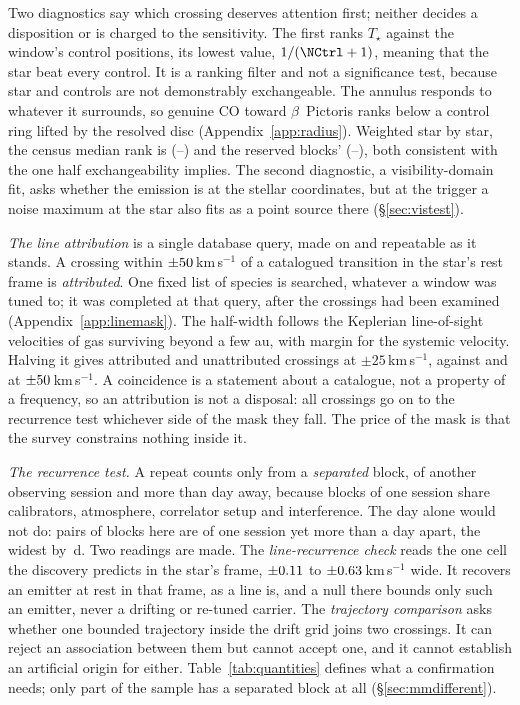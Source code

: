 Two diagnostics say which crossing deserves attention first; neither decides a
disposition or is charged to the sensitivity. The first ranks $T_\star$
against the window's \NCtrl{} control positions, its lowest value,
$1/(\NCtrl+1)$, meaning that the star beat every control. It is a ranking
filter and not a significance test, because star and controls are not
demonstrably exchangeable. The annulus responds to whatever it surrounds, so
genuine CO toward $\beta$~Pictoris ranks below a control ring lifted by the
resolved disc (Appendix~\ref{app:radius}). Weighted star by star, the census
median rank is \BkRankBalSurv{} (\BkRankBalSurvLo--\BkRankBalSurvHi) and the
reserved blocks' \BkRankBalHo{} (\BkRankBalHoLo--\BkRankBalHoHi), both
consistent with the one half exchangeability implies. The second diagnostic, a
visibility-domain fit, asks whether the emission is at the stellar
coordinates, but at the trigger a noise maximum at the star also fits as a
point source there (\S\ref{sec:vistest}).

\emph{The line attribution} is a single database query, made on \MkListDate{}
and repeatable as it stands. A crossing within $\pm50$\,km\,s$^{-1}$
of a catalogued transition in the star's rest frame is \emph{attributed}. One
fixed list of \FrNSpec{} species is searched, whatever a window was tuned to;
it was completed at that query, after the crossings had been examined
(Appendix~\ref{app:linemask}). The half-width follows the Keplerian
line-of-sight velocities of gas surviving beyond a few au, with margin for the
systemic velocity. Halving it gives \FrAttrWTwentyFive{} attributed and
\FrUnattrWTwentyFive{} unattributed crossings at $\pm25$\,km\,s$^{-1}$,
against \FrAttrWFifty{} and \FrUnattrWFifty{} at
$\pm50$\,km\,s$^{-1}$. A coincidence is a statement about a
catalogue, not a property of a frequency, so an attribution is not a disposal:
all \CnCross{} crossings go on to the recurrence test whichever side of the
mask they fall. The price of the mask is that the survey constrains nothing
inside it.

\emph{The recurrence test.} A repeat counts only from a \emph{separated}
block, of another observing session and more than \EpSep{} day away, because
blocks of one session share calibrators, atmosphere, correlator setup and
interference. The day alone would not do: \QfNPairDrop{}
pairs of blocks here are of one session yet more than a day apart, the widest
by \QfSameSessMaxD\,d. Two readings are made. The \emph{line-recurrence check}
reads the one cell the discovery predicts in the star's frame, $\pm0.11$ to
$\pm0.63$\,km\,s$^{-1}$ wide. It recovers an emitter at rest in that frame,
as a line is, and a null there bounds only such an emitter, never a drifting
or re-tuned carrier. The \emph{trajectory comparison} asks whether one bounded
trajectory inside the drift grid joins two crossings. It can reject an
association between them but cannot accept one, and it cannot establish an
artificial origin for either. Table~\ref{tab:quantities} defines what a
confirmation needs; only part of the sample has a separated block at all
(\S\ref{sec:mmdifferent}).

